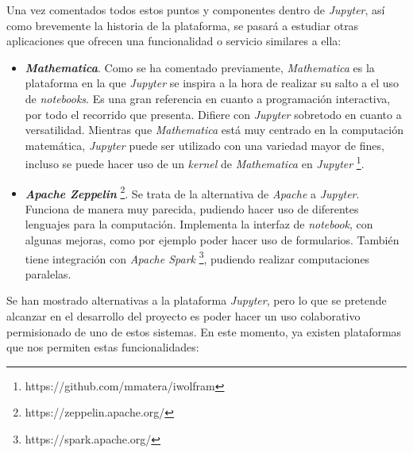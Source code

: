 \documentclass[11pt,spanish,listoffigures]{tfgetsinf}
\begin{document}
Una vez comentados todos estos puntos y componentes dentro de \textit{Jupyter}, así como brevemente la historia de la plataforma, se pasará a estudiar otras aplicaciones que ofrecen una funcionalidad o servicio similares a ella:

\begin{itemize}

\item \textbf{\textit{Mathematica}}. Como se ha comentado previamente, \textit{Mathematica} es la plataforma en la que \textit{Jupyter} se inspira a la hora de realizar su salto a el uso de \textit{notebooks}. Es una gran referencia en cuanto a programación interactiva, por todo el recorrido que presenta. Difiere con \textit{Jupyter} sobretodo en cuanto a versatilidad. Mientras que \textit{Mathematica} está muy centrado en la computación matemática, \textit{Jupyter} puede ser utilizado con una variedad mayor de fines, incluso se puede hacer uso de un \textit{kernel} de \textit{Mathematica} en \textit{Jupyter} \footnote{https://github.com/mmatera/iwolfram}.

\item \textbf{\textit{Apache Zeppelin}} \footnote{https://zeppelin.apache.org/}. Se trata de la alternativa de \textit{Apache} a \textit{Jupyter}. Funciona de manera muy parecida, pudiendo hacer uso de diferentes lenguajes para la computación. Implementa la interfaz de \textit{notebook}, con algunas mejoras, como por ejemplo poder hacer uso de formularios. También tiene integración con \textit{Apache Spark} \footnote{https://spark.apache.org/}, pudiendo realizar computaciones paralelas.

\end{itemize}

Se han mostrado alternativas a la plataforma \textit{Jupyter}, pero lo que se pretende alcanzar en el desarrollo del proyecto es poder hacer un uso colaborativo permisionado de uno de estos sistemas. En este momento, ya existen plataformas que nos permiten estas funcionalidades: 
\end{document}
